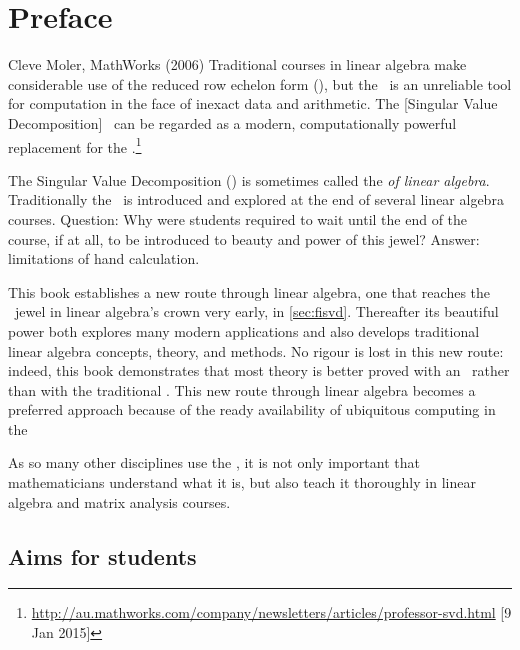 \tableofcontents


\chapter*{Preface}


\begin{quoted}{Cleve Moler, MathWorks (2006)}
Traditional courses in linear algebra make considerable use of the 
{reduced row echelon form} (\rref), but the \rref\ is an unreliable tool for computation in the face of inexact data and arithmetic. 
The [Singular Value Decomposition] \svd\ can be regarded as a modern, computationally powerful replacement for the \rref.\footnote{\url{http://au.mathworks.com/company/newsletters/articles/professor-svd.html} [9 Jan 2015]}
\end{quoted}

The Singular Value Decomposition (\svd) is sometimes called the \emph{ of linear algebra}.
Traditionally the \svd\ is introduced and explored at the end of several linear algebra courses.
Question: Why were students required to wait until the end of the course, if at all, to be introduced to beauty and power of this jewel?
Answer: limitations of hand calculation.

This book establishes a new route through linear algebra, one that reaches the \svd\ jewel in linear algebra's crown very early, in \autoref{sec:fisvd}.
Thereafter its beautiful power both explores many modern applications and also develops traditional linear algebra concepts, theory, and methods.
No rigour is lost in this new route: indeed, this book demonstrates that most theory is better proved with an \svd\ rather than with the traditional \rref.
This new route through linear algebra becomes a preferred approach because of the ready availability of ubiquitous computing in the 


\begin{quoted}{\cite[p.30]{Turner2014}}
As so many other disciplines use the \svd, it is not only important that mathematicians understand what it is, but also teach it thoroughly in linear algebra and matrix analysis courses.
\end{quoted}











\section*{Aims for students}

